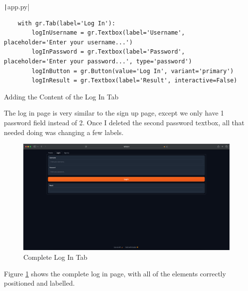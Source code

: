 \documentclass[12pt]{report}
\newcommand{\pil}[1]{\protect\texttt|#1|}
\begin{document}
\begin{listing}[H]
\pil{app.py}
\begin{verbatim}
    with gr.Tab(label='Log In'):
        logInUsername = gr.Textbox(label='Username', placeholder='Enter your username...')
        logInPassword = gr.Textbox(label='Password', placeholder='Enter your password...', type='password')
        logInButton = gr.Button(value='Log In', variant='primary')
        logInResult = gr.Textbox(label='Result', interactive=False)
\end{verbatim}
\caption{Adding the Content of the Log In Tab}\label{cs:logInContent}
\end{listing}

The log in page is very similar to the sign up page, except we only have 1 password field instead of 2. Once I deleted the second password textbox, all that needed doing was changing a few labels.

\begin{figure}[H]
\centering
\includegraphics[width=14cm]{ss14.6.png}
\caption{Complete Log In Tab}\label{fig:ss14.6}
\end{figure}

Figure \ref{fig:ss14.6} shows the complete log in page, with all of the elements correctly positioned and labelled.

\begin{center}
\end{center}
\end{document}
